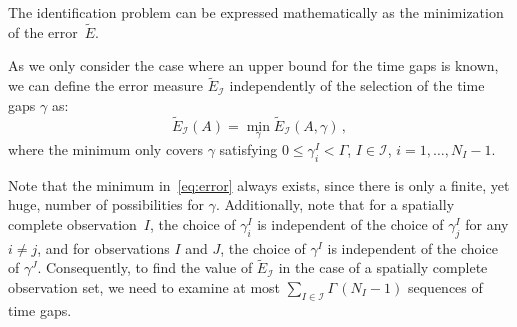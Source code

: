 
The identification problem can be expressed mathematically as the minimization of the error~$\widetilde{E}$. %

As we only consider the case where an upper bound for the time gaps is known, we can define the error measure $\widetilde{E}_{\mathcal{I}}$ independently of the selection of the time gaps $\gamma$ as:
\begin{equation}
	\widetilde{E}_\mathcal{I}(A) = \min_{\gamma} \widetilde{E}_\mathcal{I}(A, \gamma)\,,
	\label{eq:error}
\end{equation}
where the minimum only covers $\gamma$ satisfying $0\leq \gamma^I_i < \Gamma$, $I\in\mathcal{I}$, $i=1,\dotsc,N_I-1$.

Note that the minimum in~\eqref{eq:error} always exists, since there is only a finite, yet huge, number of possibilities for $\gamma$. Additionally, note that for a spatially complete observation~$I$, the choice of $\gamma^I_i$ is independent of the choice of $\gamma^I_j$ for any $i\neq j$, and for observations $I$ and $J$, the choice of $\gamma^I$ is independent of the choice of $\gamma^J$. Consequently, to find the value of $\widetilde{E}_\mathcal{I}$ in the case of a spatially complete observation set, we need to examine at most $\sum_{I\in\mathcal{I}}\Gamma\,(N_I-1)$ sequences of time gaps.

